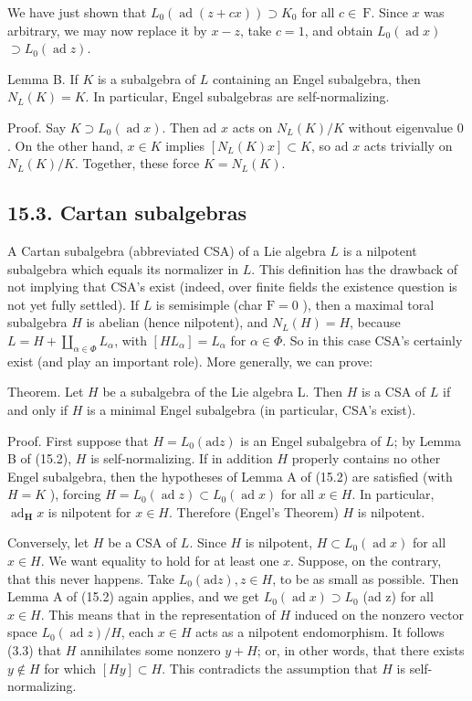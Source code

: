 \documentclass[10pt]{article}
\begin{document}
We have just shown that $L_{0}(\operatorname{ad}(z+c x)) \supset K_{0}$ for all $c \in \mathrm{~F}$. Since $x$ was arbitrary, we may now replace it by $x-z$, take $c=1$, and obtain $L_{0}(\operatorname{ad} x)$ $\supset L_{0}(\operatorname{ad} z)$.

Lemma B. If $K$ is a subalgebra of $L$ containing an Engel subalgebra, then $N_{L}(K)=K$. In particular, Engel subalgebras are self-normalizing.

Proof. Say $K \supset L_{0}(\operatorname{ad} x)$. Then ad $x$ acts on $N_{L}(K) / K$ without eigenvalue 0 . On the other hand, $x \in K$ implies $\left[N_{L}(K) x\right] \subset K$, so ad $x$ acts trivially on $N_{L}(K) / K$. Together, these force $K=N_{L}(K)$.

\subsection*{15.3. Cartan subalgebras}
A Cartan subalgebra (abbreviated CSA) of a Lie algebra $L$ is a nilpotent subalgebra which equals its normalizer in $L$. This definition has the drawback of not implying that CSA's exist (indeed, over finite fields the existence question is not yet fully settled). If $L$ is semisimple (char $\mathrm{F}=0$ ), then a maximal toral subalgebra $H$ is abelian (hence nilpotent), and $N_{L}(H)=H$, because $L=H+\coprod_{\alpha \in \Phi} L_{\alpha}$, with $\left[H L_{\alpha}\right]=L_{\alpha}$ for $\alpha \in \Phi$. So in this case CSA's certainly exist (and play an important role). More generally, we can prove:

Theorem. Let $H$ be a subalgebra of the Lie algebra L. Then $H$ is a CSA of $L$ if and only if $H$ is a minimal Engel subalgebra (in particular, CSA's exist).

Proof. First suppose that $H=L_{0}(\mathrm{ad} z)$ is an Engel subalgebra of $L$; by Lemma B of (15.2), $H$ is self-normalizing. If in addition $H$ properly contains no other Engel subalgebra, then the hypotheses of Lemma A of (15.2) are satisfied (with $H=K$ ), forcing $H=L_{0}(\operatorname{ad} z) \subset L_{0}(\operatorname{ad} x)$ for all $x \in H$. In particular, $\operatorname{ad}_{\boldsymbol{H}} x$ is nilpotent for $x \in H$. Therefore (Engel's Theorem) $H$ is nilpotent.

Conversely, let $H$ be a CSA of $L$. Since $H$ is nilpotent, $H \subset L_{0}(\operatorname{ad} x)$ for all $x \in H$. We want equality to hold for at least one $x$. Suppose, on the contrary, that this never happens. Take $L_{0}(\mathrm{ad} z), z \in H$, to be as small as possible. Then Lemma A of (15.2) again applies, and we get $L_{0}(\operatorname{ad} x) \supset L_{0}$ (ad z) for all $x \in H$. This means that in the representation of $H$ induced on the nonzero vector space $L_{0}(\operatorname{ad} z) / H$, each $x \in H$ acts as a nilpotent endomorphism. It follows (3.3) that $H$ annihilates some nonzero $y+H$; or, in other words, that there exists $y \notin H$ for which $[H y] \subset H$. This contradicts the assumption that $H$ is self-normalizing.
\end{document}
